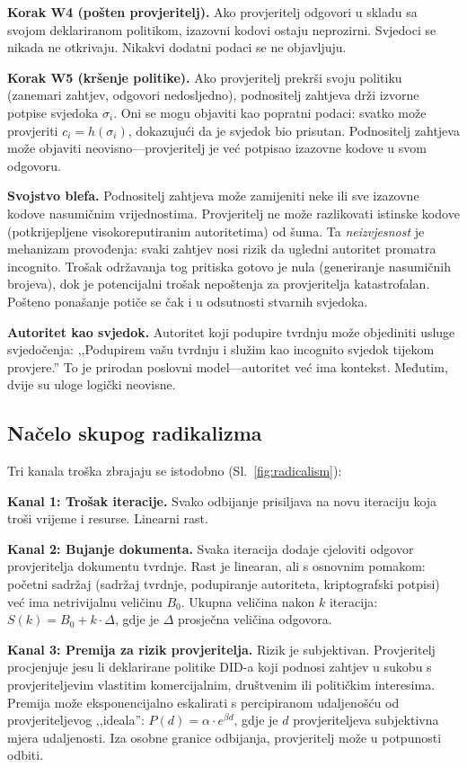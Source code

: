 \documentclass[11pt,a4paper,twocolumn]{article}
\begin{document}
\textbf{Korak W4 (pošten provjeritelj).} Ako provjeritelj odgovori u skladu sa svojom deklariranom politikom, izazovni kodovi ostaju neprozirni. Svjedoci se nikada ne otkrivaju. Nikakvi dodatni podaci se ne objavljuju.

\textbf{Korak W5 (kršenje politike).} Ako provjeritelj prekrši svoju politiku (zanemari zahtjev, odgovori nedosljedno), podnositelj zahtjeva drži izvorne potpise svjedoka $\sigma_i$. Oni se mogu objaviti kao popratni podaci: svatko može provjeriti $c_i = h(\sigma_i)$, dokazujući da je svjedok bio prisutan. Podnositelj zahtjeva može objaviti neovisno---provjeritelj je već potpisao izazovne kodove u svom odgovoru.

\textbf{Svojstvo blefa.} Podnositelj zahtjeva može zamijeniti neke ili sve izazovne kodove nasumičnim vrijednostima. Provjeritelj ne može razlikovati istinske kodove (potkrijepljene visokoreputiranim autoritetima) od šuma. Ta \emph{neizvjesnost} je mehanizam provođenja: svaki zahtjev nosi rizik da ugledni autoritet promatra incognito. Trošak održavanja tog pritiska gotovo je nula (generiranje nasumičnih brojeva), dok je potencijalni trošak nepoštenja za provjeritelja katastrofalan. Pošteno ponašanje potiče se čak i u odsutnosti stvarnih svjedoka.

\textbf{Autoritet kao svjedok.} Autoritet koji podupire tvrdnju može objediniti usluge svjedočenja: ,,Podupirem vašu tvrdnju i služim kao incognito svjedok tijekom provjere.'' To je prirodan poslovni model---autoritet već ima kontekst. Međutim, dvije su uloge logički neovisne.

\subsection{Načelo skupog radikalizma}

Tri kanala troška zbrajaju se istodobno (Sl.~\ref{fig:radicalism}):

\textbf{Kanal 1: Trošak iteracije.} Svako odbijanje prisiljava na novu iteraciju koja troši vrijeme i resurse. Linearni rast.

\textbf{Kanal 2: Bujanje dokumenta.} Svaka iteracija dodaje cjeloviti odgovor provjeritelja dokumentu tvrdnje. Rast je linearan, ali s osnovnim pomakom: početni sadržaj (sadržaj tvrdnje, podupiranje autoriteta, kriptografski potpisi) već ima netrivijalnu veličinu $B_0$. Ukupna veličina nakon $k$ iteracija: $S(k) = B_0 + k \cdot \Delta$, gdje je $\Delta$ prosječna veličina odgovora.

\textbf{Kanal 3: Premija za rizik provjeritelja.} Rizik je subjektivan. Provjeritelj procjenjuje jesu li deklarirane politike DID-a koji podnosi zahtjev u sukobu s provjeriteljevim vlastitim komercijalnim, društvenim ili političkim interesima. Premija može eksponencijalno eskalirati s percipiranom udaljenošću od provjeriteljevog ,,ideala'': $P(d) = \alpha \cdot e^{\beta d}$, gdje je $d$ provjeriteljeva subjektivna mjera udaljenosti. Iza osobne granice odbijanja, provjeritelj može u potpunosti odbiti.
\end{document}
